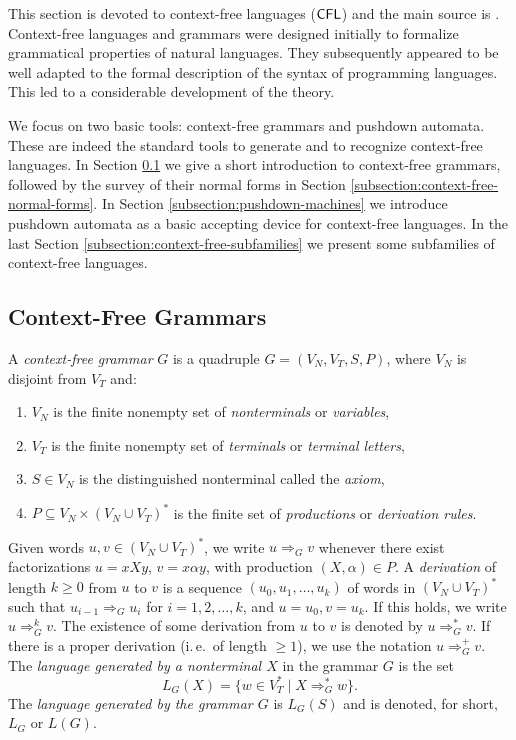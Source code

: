 This section is devoted to  context-free languages \index{$\CFL$}($\CFL$) and the main source is \citep{AuBeBo1997context-free}. Context-free languages and grammars were designed initially to formalize grammatical properties of natural languages. They subsequently appeared to be well adapted to the formal description of the syntax of programming languages. This led to a considerable development of the theory.

We focus on two basic tools: context-free grammars and  pushdown automata. These are indeed the standard tools to generate and to recognize context-free languages. In Section \ref{subsection:context-free-grammars} we give a short introduction to context-free grammars, followed by the survey of their normal forms in Section \ref{subsection:context-free-normal-forms}. In Section \ref{subsection:pushdown-machines} we introduce pushdown automata as a basic accepting device for context-free languages. In the last Section \ref{subsection:context-free-subfamilies} we present some subfamilies of context-free languages.

\subsection{Context-Free Grammars}
\label{subsection:context-free-grammars}

A \emph{context-free grammar} $G$ is a quadruple $G = (V_N, V_T, S, P)$, where $V_N$ is disjoint from $V_T$ and:

\begin{enumerate}[]
\item $V_N$ is the finite nonempty set of \emph{nonterminals} or \emph{variables},
\item $V_T$ is the finite nonempty set of \emph{terminals} or \emph{terminal letters},
\item $S \in V_N$ is the distinguished nonterminal called the \emph{axiom},
\item $P \subseteq V_N \times (V_N \cup V_T)^*$ is the finite set of \emph{productions} or \emph{derivation rules}.
\end{enumerate}

Given words $u, v \in (V_N \cup V_T)^*$, we write $u \Rightarrow_G v$ whenever there exist factorizations $u = x X y$, $v = x \alpha y$, with production $(X, \alpha) \in P$. A \emph{derivation} of length $k \ge 0$ from $u$ to $v$ is a sequence $(u_0, u_1, \ldots, u_k)$ of words in $(V_N \cup V_T)^*$ such that $u_{i-1} \Rightarrow_G u_i$ for $i = 1, 2, \ldots, k$, and $u = u_0, v = u_k$. If this holds, we write $u \Rightarrow^k_G v$. The existence of some derivation from $u$ to $v$ is denoted by $u \Rightarrow^*_G v$. If there is a proper derivation
(i.\,e.\ of length $\ge 1$), we use the notation $u \Rightarrow^+_G v$. The \emph{language generated by a nonterminal $X$} in the grammar $G$ is the set
$$L_G(X) = \{w \in V_T^* \mid X \Rightarrow^*_G w\}.$$
The \emph{language generated by the grammar $G$} is $L_G(S)$ and is denoted, for short, $L_G$ or $L(G)$.

